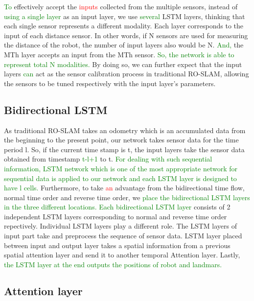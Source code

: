 \documentclass[letterpaper, 10 pt, conference]{ieeeconf}  %
\begin{document}
\textcolor{green}{To} effectively accept the \textcolor{red}{inputs} collected from the multiple sensors, instead of \textcolor{green}{using a single layer} as an input layer, we use \textcolor{green}{several} LSTM layers, thinking that each single sensor represents a different modality. Each layer corresponds to the input of each distance sensor. In other words, if N sensors are used for measuring the distance of the robot, the number of input layers also would be N. \textcolor{green}{And,} the MTh layer accepts an input from the MTh sensor. \textcolor{green}{So, the network is able to represent total N modalities.} By doing so, we can further expect that the input layers \textcolor{green}{can} act as the sensor calibration process in traditional RO-SLAM, allowing the sensors to be tuned respectively with the input layer’s parameters.

\subsection{Bidirectional LSTM}

As traditional RO-SLAM \cite{blanco2008pure,blanco2008efficient} takes an odometry which is an accumulated data from the beginning to the present point, our network takes sensor data for the time period l. So, if the current time stamp is t, the input layers take the sensor data obtained from timestamp \textcolor{green}{t-l+1} to t. \textcolor{green}{For dealing with such sequential information, LSTM network which is one of the most appropriate network for sequential data is applied to our network and each LSTM layer is designed to have l cells.} Furthermore, to take \textcolor{red}{an} advantage from the bidirectional time flow, normal time order and reverse time order, we \textcolor{green}{place the bidirectional LSTM layers in the three different locations. Each bidirectional LSTM layer} consists of 2 independent LSTM layers corresponding to normal and reverse time order repectively. Individual LSTM layers play a different role. The LSTM layers of input part take and preprocess the sequence of sensor data. LSTM layer placed between input and output layer takes a spatial information from a previous spatial attention layer and send it to another temporal Attention layer. Lastly, \textcolor{green}{the LSTM layer at the end outputs the positions of robot and landmars.}

\subsection{Attention layer}
\end{document}
